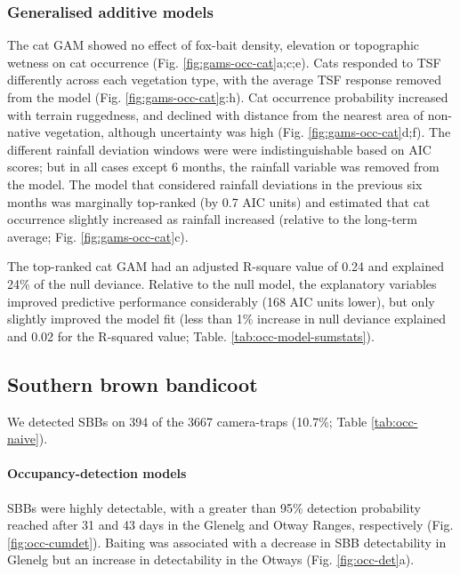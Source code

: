 \documentclass[]{elsarticle} %
\begin{document}
\hypertarget{generalised-additive-models-2}{%
\subsubsection{Generalised additive models}\label{generalised-additive-models-2}}

The cat GAM showed no effect of fox-bait density, elevation or topographic wetness on cat occurrence (Fig. \ref{fig:gams-occ-cat}a;c;e). Cats responded to TSF differently across each vegetation type, with the average TSF response removed from the model (Fig. \ref{fig:gams-occ-cat}g:h). Cat occurrence probability increased with terrain ruggedness, and declined with distance from the nearest area of non-native vegetation, although uncertainty was high (Fig. \ref{fig:gams-occ-cat}d;f). The different rainfall deviation windows were were indistinguishable based on AIC scores; but in all cases except 6 months, the rainfall variable was removed from the model. The model that considered rainfall deviations in the previous six months was marginally top-ranked (by 0.7 AIC units) and estimated that cat occurrence slightly increased as rainfall increased (relative to the long-term average; Fig. \ref{fig:gams-occ-cat}c).

The top-ranked cat GAM had an adjusted R-square value of 0.24 and explained 24\% of the null deviance. Relative to the null model, the explanatory variables improved predictive performance considerably (168 AIC units lower), but only slightly improved the model fit (less than 1\% increase in null deviance explained and 0.02 for the R-squared value; Table. \ref{tab:occ-model-sumstats}).

\hypertarget{southern-brown-bandicoot}{%
\subsection{Southern brown bandicoot}\label{southern-brown-bandicoot}}

We detected SBBs on 394 of the 3667 camera-traps (10.7\%; Table \ref{tab:occ-naive}).

\hypertarget{occupancy-detection-models-3}{%
\paragraph{Occupancy-detection models}\label{occupancy-detection-models-3}}

SBBs were highly detectable, with a greater than 95\% detection probability reached after 31 and 43 days in the Glenelg and Otway Ranges, respectively (Fig. \ref{fig:occ-cumdet}). Baiting was associated with a decrease in SBB detectability in Glenelg but an increase in detectability in the Otways (Fig. \ref{fig:occ-det}a).
\end{document}
